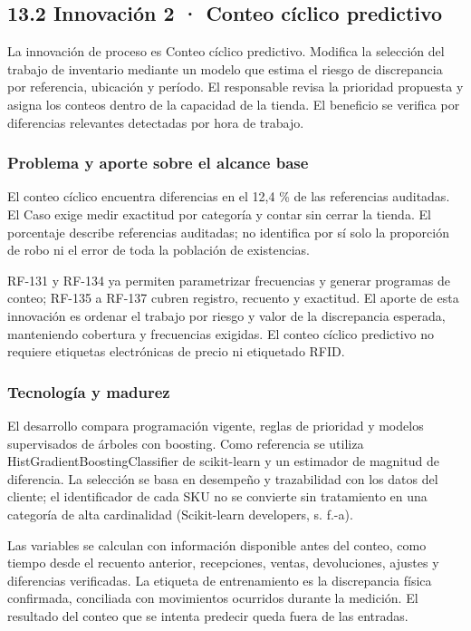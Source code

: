 \documentclass[11pt]{article}
\begin{document}
\subsection{13.2 Innovación 2 · Conteo cíclico predictivo}\label{innovaciuxf3n-2}

La innovación de proceso es Conteo cíclico predictivo. Modifica la selección del trabajo de inventario mediante un modelo que estima el riesgo de discrepancia por referencia, ubicación y período. El responsable revisa la prioridad propuesta y asigna los conteos dentro de la capacidad de la tienda. El beneficio se verifica por diferencias relevantes detectadas por hora de trabajo.

\subsubsection{Problema y aporte sobre el alcance base}\label{problema-y-aporte-sobre-el-alcance-base}

El conteo cíclico encuentra diferencias en el 12,4 \% de las referencias auditadas. El Caso exige medir exactitud por categoría y contar sin cerrar la tienda. El porcentaje describe referencias auditadas; no identifica por sí solo la proporción de robo ni el error de toda la población de existencias.

RF-131 y RF-134 ya permiten parametrizar frecuencias y generar programas de conteo; RF-135 a RF-137 cubren registro, recuento y exactitud. El aporte de esta innovación es ordenar el trabajo por riesgo y valor de la discrepancia esperada, manteniendo cobertura y frecuencias exigidas. El conteo cíclico predictivo no requiere etiquetas electrónicas de precio ni etiquetado RFID.

\subsubsection{Tecnología y madurez}\label{tecnologuxeda-y-madurez-1}

El desarrollo compara programación vigente, reglas de prioridad y modelos supervisados de árboles con boosting. Como referencia se utiliza HistGradientBoostingClassifier de scikit-learn y un estimador de magnitud de diferencia. La selección se basa en desempeño y trazabilidad con los datos del cliente; el identificador de cada SKU no se convierte sin tratamiento en una categoría de alta cardinalidad (Scikit-learn developers, s. f.-a).

Las variables se calculan con información disponible antes del conteo, como tiempo desde el recuento anterior, recepciones, ventas, devoluciones, ajustes y diferencias verificadas. La etiqueta de entrenamiento es la discrepancia física confirmada, conciliada con movimientos ocurridos durante la medición. El resultado del conteo que se intenta predecir queda fuera de las entradas.
\end{document}

